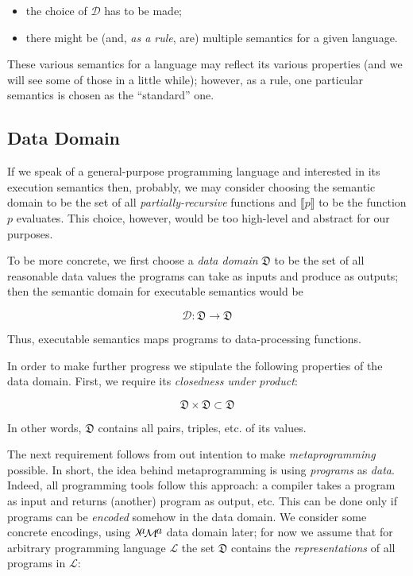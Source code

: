 \documentclass{article}
\newcommand{\sembr}[1]{\llbracket{#1}\rrbracket}
\newcommand{\lama}{$\lambda\kern -.1667em\lower -.5ex\hbox{$a$}\kern -.1000em\lower .2ex\hbox{$\mathcal M$}\kern -.1000em\lower -.5ex\hbox{$a$}$\xspace}
\begin{document}
\begin{itemize}
\item the choice of $\mathcal D$ has to be made;
\item there might be (and, \emph{as a rule}, are) multiple semantics for a given language.
\end{itemize}

These various semantics for a language may reflect its various properties (and we will see some of those in a little while); however, as a rule, one particular
semantics is chosen as the ``standard'' one.

\subsection{Data Domain}

If we speak of a general-purpose programming language and interested in its execution semantics then, probably, we may consider choosing the semantic domain
to be the set of all \emph{partially-recursive} functions and $\sembr{p}$ to be the function $p$ evaluates. This choice, however, would be too high-level and
abstract for our purposes.

To be more concrete, we first choose a \emph{data domain} $\mathfrak D$ to be the set of all reasonable data values the programs can take as inputs and
produce as outputs; then the semantic domain for executable semantics would be

\[
\mathcal{D}:\mathfrak{D}\to\mathfrak{D}
\]

Thus, executable semantics maps programs to data-processing functions.

In order to make further progress we stipulate the following properties of the data domain. First, we require its \emph{closedness under product}:

\[
\mathfrak{D}\times\mathfrak{D}\subset\mathfrak{D}
\]

In other words, $\mathfrak{D}$ contains all pairs, triples, etc. of its values.

The next requirement follows from out intention to make \emph{metaprogramming} possible. In short, the idea behind metaprogramming is
using \emph{programs} as \emph{data}. Indeed, all programming tools follow this approach: a compiler takes a program as input and
returns (another) program as output, etc. This can be done only if programs can be \emph{encoded} somehow in the data domain. We
consider some concrete encodings, using \lama data domain later; for now we assume that for arbitrary programming language $\mathcal{L}$
the set $\mathfrak{D}$ contains the \emph{representations}
of all programs in $\mathcal{L}$:
\end{document}
